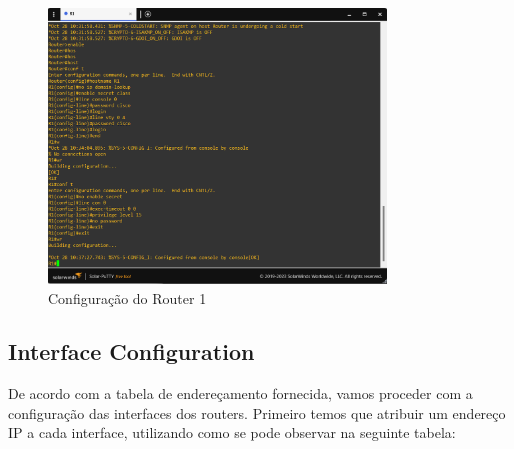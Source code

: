 \documentclass[11pt,english, openright, oneside]{book}
\begin{document}
\begin{figure}[H]
    \centering
    \includegraphics[width=0.8\textwidth]{imagens/Tarefa1/1.init_conf.png}
    \caption{Configuração do Router 1}
    \label{fig:config1}
\end{figure}

\newpage
\subsection{Interface Configuration}
\vspace{0.2cm}

De acordo com a tabela de endereçamento fornecida, vamos proceder com a configuração das interfaces dos routers. Primeiro temos que atribuir um endereço IP a cada interface, utilizando como se pode observar na seguinte tabela:
\end{document}

